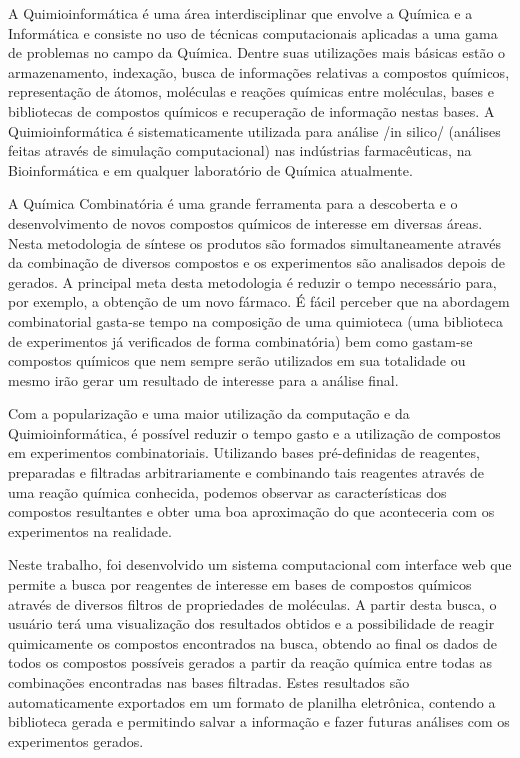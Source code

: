 \documentclass{abnt}
\begin{document}
A Quimioinformática é uma área interdisciplinar que envolve a Química e a Informática e consiste no uso de técnicas computacionais aplicadas a uma gama de problemas no campo da Química. Dentre suas utilizações mais básicas estão o armazenamento, indexação, busca de informações relativas a compostos químicos, representação de átomos, moléculas e reações químicas entre moléculas, bases e bibliotecas de compostos químicos e recuperação de informação nestas bases. A Quimioinformática é sistematicamente utilizada para análise /in silico/ (análises feitas através de simulação computacional) nas indústrias farmacêuticas, na Bioinformática e em qualquer laboratório de Química atualmente.

A Química Combinatória é uma grande ferramenta para a descoberta e o desenvolvimento de novos compostos químicos de interesse em diversas áreas. Nesta metodologia de síntese os produtos são formados simultaneamente através da combinação de diversos compostos e os experimentos são analisados depois de gerados. A principal meta desta metodologia é reduzir o tempo necessário para, por exemplo, a obtenção de um novo fármaco. É fácil perceber que na abordagem combinatorial gasta-se tempo na composição de uma quimioteca (uma biblioteca de experimentos já verificados de forma combinatória) bem como gastam-se compostos químicos que nem sempre serão utilizados em sua totalidade ou mesmo irão gerar um resultado de interesse para a análise final.

Com a popularização e uma maior utilização da computação e da Quimioinformática, é possível reduzir o tempo gasto e a utilização de compostos em experimentos combinatoriais. Utilizando bases pré-definidas de reagentes, preparadas e filtradas arbitrariamente e combinando tais reagentes através de uma reação química conhecida, podemos observar as características dos compostos resultantes e obter uma boa aproximação do que aconteceria com os experimentos na realidade.

Neste trabalho, foi desenvolvido um sistema computacional com interface web que permite a busca por reagentes de interesse em bases de compostos químicos através de diversos filtros de propriedades de moléculas. A partir desta busca, o usuário terá uma visualização dos resultados obtidos e a possibilidade de reagir quimicamente os compostos encontrados na busca, obtendo ao final os dados de todos os compostos possíveis gerados a partir da reação química entre todas as combinações encontradas nas bases filtradas. Estes resultados são automaticamente exportados em um formato de planilha eletrônica, contendo a biblioteca gerada e permitindo salvar a informação e fazer futuras análises com os experimentos gerados.
\end{document}
